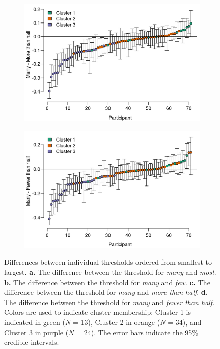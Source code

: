 \documentclass{article}
\begin{document}
 \begin{figure}[H] \ContinuedFloat
    \begin{subfigure}[b]{0.85\textwidth}
     \includegraphics[width=\linewidth]{Figure2.6c.png}
     \caption{\label{fig:fig2.6c}}
    \end{subfigure}
    
    \begin{subfigure}[b]{0.85\textwidth}
     \includegraphics[width=\linewidth]{Figure2.6d.png}
     \caption{\label{fig:fig2.6d}}
    \end{subfigure}
    \caption{Differences between individual thresholds ordered from smallest to largest. \textbf{a.} The difference between the threshold for \textit{many} and \textit{most}. \textbf{b.} The difference between the threshold for \textit{many} and \textit{few}. \textbf{c.} The difference between the threshold for \textit{many} and \textit{more than half}. \textbf{d.} The difference between the threshold for \textit{many} and \textit{fewer than half}. Colors are used to indicate cluster membership: Cluster 1 is indicated in green (\textit{N} = 13), Cluster 2 in orange (\textit{N} = 34), and Cluster 3 in purple (\textit{N} = 24). The error bars indicate the 95\% credible intervals.}
    \label{fig:fig2.6}
\end{figure}
\end{document}

